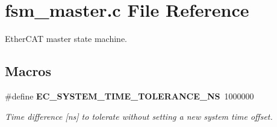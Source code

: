 \section{fsm\-\_\-master.\-c File Reference}
\label{fsm__master_8c}


Ether\-C\-A\-T master state machine.  


\subsection*{Macros}
\begin{DoxyCompactItemize}
\item 
\#define {\bf E\-C\-\_\-\-S\-Y\-S\-T\-E\-M\-\_\-\-T\-I\-M\-E\-\_\-\-T\-O\-L\-E\-R\-A\-N\-C\-E\-\_\-\-N\-S}~1000000\label{fsm__master_8c_a997e9f2ec2485eb23e2ff0831547b772}

\begin{DoxyCompactList}\small\item\em Time difference [ns] to tolerate without setting a new system time offset. \end{DoxyCompactList}\end{DoxyCompactItemize}
